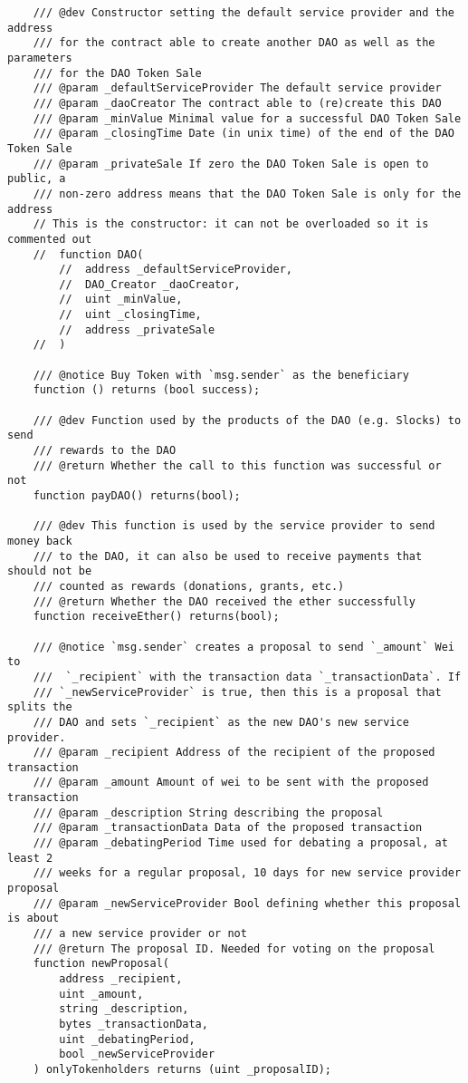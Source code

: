 \documentclass[9pt,oneside]{amsart}
\begin{document}
\begin{appendix}
\begin{verbatim}
    /// @dev Constructor setting the default service provider and the address
    /// for the contract able to create another DAO as well as the parameters
    /// for the DAO Token Sale
    /// @param _defaultServiceProvider The default service provider
    /// @param _daoCreator The contract able to (re)create this DAO
    /// @param _minValue Minimal value for a successful DAO Token Sale
    /// @param _closingTime Date (in unix time) of the end of the DAO Token Sale
    /// @param _privateSale If zero the DAO Token Sale is open to public, a
    /// non-zero address means that the DAO Token Sale is only for the address
    // This is the constructor: it can not be overloaded so it is commented out
    //  function DAO(
        //  address _defaultServiceProvider,
        //  DAO_Creator _daoCreator,
        //  uint _minValue,
        //  uint _closingTime,
        //  address _privateSale
    //  )

    /// @notice Buy Token with `msg.sender` as the beneficiary
    function () returns (bool success);

    /// @dev Function used by the products of the DAO (e.g. Slocks) to send
    /// rewards to the DAO
    /// @return Whether the call to this function was successful or not
    function payDAO() returns(bool);

    /// @dev This function is used by the service provider to send money back
    /// to the DAO, it can also be used to receive payments that should not be
    /// counted as rewards (donations, grants, etc.)
    /// @return Whether the DAO received the ether successfully
    function receiveEther() returns(bool);

    /// @notice `msg.sender` creates a proposal to send `_amount` Wei to
    ///  `_recipient` with the transaction data `_transactionData`. If
    /// `_newServiceProvider` is true, then this is a proposal that splits the
    /// DAO and sets `_recipient` as the new DAO's new service provider.
    /// @param _recipient Address of the recipient of the proposed transaction
    /// @param _amount Amount of wei to be sent with the proposed transaction
    /// @param _description String describing the proposal
    /// @param _transactionData Data of the proposed transaction
    /// @param _debatingPeriod Time used for debating a proposal, at least 2
    /// weeks for a regular proposal, 10 days for new service provider proposal
    /// @param _newServiceProvider Bool defining whether this proposal is about
    /// a new service provider or not
    /// @return The proposal ID. Needed for voting on the proposal
    function newProposal(
        address _recipient,
        uint _amount,
        string _description,
        bytes _transactionData,
        uint _debatingPeriod,
        bool _newServiceProvider
    ) onlyTokenholders returns (uint _proposalID);


\end{verbatim}
\end{appendix}
\end{document}
